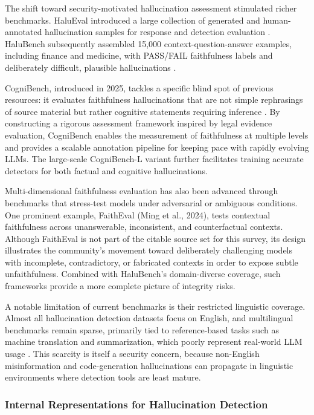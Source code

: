 \documentclass[11pt,a4paper]{article}
\begin{document}
The shift toward security-motivated hallucination assessment stimulated richer benchmarks. HaluEval introduced a large collection of generated and human-annotated hallucination samples for response and detection evaluation \cite{Li_2023_HaluEval}. HaluBench subsequently assembled 15,000 context-question-answer examples, including finance and medicine, with PASS/FAIL faithfulness labels and deliberately difficult, plausible hallucinations \cite{Ravi_2024_Lynx_ce273f20}.

CogniBench, introduced in 2025, tackles a specific blind spot of previous resources: it evaluates faithfulness hallucinations that are not simple rephrasings of source material but rather cognitive statements requiring inference \cite{Tang_2025_Cognibench_0b308648}. By constructing a rigorous assessment framework inspired by legal evidence evaluation, CogniBench enables the measurement of faithfulness at multiple levels and provides a scalable annotation pipeline for keeping pace with rapidly evolving LLMs. The large-scale CogniBench-L variant further facilitates training accurate detectors for both factual and cognitive hallucinations.

Multi-dimensional faithfulness evaluation has also been advanced through benchmarks that stress-test models under adversarial or ambiguous conditions. One prominent example, FaithEval (Ming et al., 2024), tests contextual faithfulness across unanswerable, inconsistent, and counterfactual contexts. Although FaithEval is not part of the citable source set for this survey, its design illustrates the community's movement toward deliberately challenging models with incomplete, contradictory, or fabricated contexts in order to expose subtle unfaithfulness. Combined with HaluBench's domain-diverse coverage, such frameworks provide a more complete picture of integrity risks.

A notable limitation of current benchmarks is their restricted linguistic coverage. Almost all hallucination detection datasets focus on English, and multilingual benchmarks remain sparse, primarily tied to reference-based tasks such as machine translation and summarization, which poorly represent real-world LLM usage \cite{Islam_2025_LLM_e0a71a22}. This scarcity is itself a security concern, because non-English misinformation and code-generation hallucinations can propagate in linguistic environments where detection tools are least mature.

\subsubsection{Internal Representations for Hallucination Detection}
\end{document}
